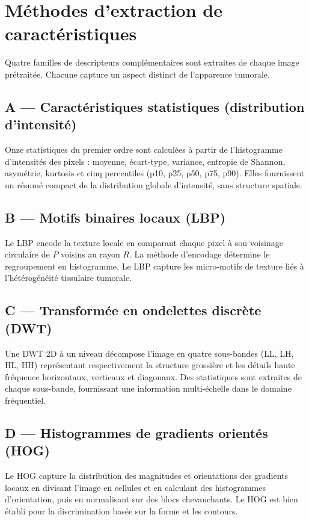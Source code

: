 \section{Méthodes d'extraction de caractéristiques}
\label{sec:features}

Quatre familles de descripteurs complémentaires sont extraites de chaque image
prétraitée. Chacune capture un aspect distinct de l'apparence tumorale.

\subsection{A --- Caractéristiques statistiques (distribution d'intensité)}

Onze statistiques du premier ordre sont calculées à partir de l'histogramme d'intensités
des pixels : moyenne, écart-type, variance, entropie de Shannon, asymétrie, kurtosis
et cinq percentiles (p10, p25, p50, p75, p90). Elles fournissent un résumé compact
de la distribution globale d'intensité, sans structure spatiale.

\subsection{B --- Motifs binaires locaux (LBP)}

Le LBP encode la texture locale en comparant chaque pixel à son voisinage circulaire
de $P$ voisins au rayon $R$. La méthode d'encodage détermine le regroupement en histogramme.
Le LBP capture les micro-motifs de texture liés à l'hétérogénéité tissulaire tumorale.

\subsection{C --- Transformée en ondelettes discrète (DWT)}

Une DWT 2D à un niveau décompose l'image en quatre sous-bandes (LL, LH, HL, HH)
représentant respectivement la structure grossière et les détails haute fréquence
horizontaux, verticaux et diagonaux. Des statistiques sont extraites de chaque
sous-bande, fournissant une information multi-échelle dans le domaine fréquentiel.

\subsection{D --- Histogrammes de gradients orientés (HOG)}

Le HOG capture la distribution des magnitudes et orientations des gradients locaux
en divisant l'image en cellules et en calculant des histogrammes d'orientation,
puis en normalisant sur des blocs chevauchants. Le HOG est bien établi pour la
discrimination basée sur la forme et les contours.

